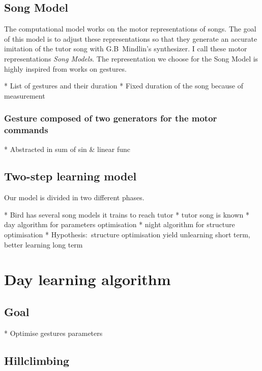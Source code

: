 \documentclass{report}
\begin{document}
\subsection{Song Model}\label{song-model}

The computational model works on the motor representations of songs. The goal of
this model is to adjust these representations so that they generate an accurate
imitation of the tutor song with G.B~Mindlin's synthesizer. I call these motor
representations \emph{Song Models}. The representation we choose for the Song
Model is highly inspired from \textcite{amador_elemental_2013} works on
gestures.


  * List of gestures and their duration
  * Fixed duration of the song because of measurement

\subsubsection{Gesture composed of two generators for the motor
commands}\label{gesture-composed-of-two-generators-for-the-motor-commands}

  * Abstracted in sum of sin \& linear func

\subsection{Two-step learning model} \label{two-step-learning-model}

Our model is divided in two different phases.

  * Bird has several song models it trains to reach tutor
  * tutor song is known
  * day algorithm for parameters optimisation
  * night algorithm for structure optimisation
  * Hypothesis:~structure optimisation yield unlearning short term, better
  learning long term


\section{Day learning algorithm}\label{day-learning-algorithm}

\subsection{Goal}\label{goal}
  * Optimise gestures parameters
\subsection{Hillclimbing}\label{hillclimbing}
\end{document}

